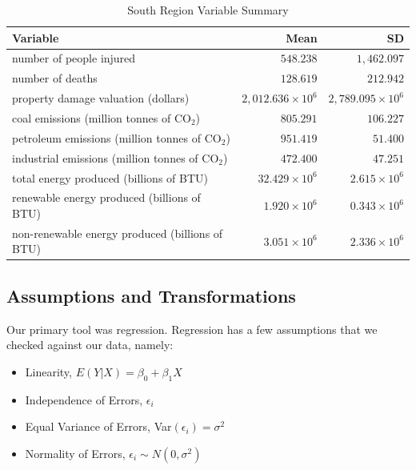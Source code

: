 \documentclass[10pt,]{article}
\begin{document}
\begin{center}
  \begin{table}[h!]
  \caption{\label{tab:table-name}South Region Variable Summary}
  \smallskip
  \begin{center}
  \begin{tabular}{|l r r|}
  \hline
  Variable & Mean & SD \\ [0.5ex] 
  \hline\hline
  number of people injured & $548.238$ & $1,462.097$ \\ 
  \hline
  number of deaths & $128.619$ & $212.942$ \\
  \hline
  property damage valuation (dollars) & $2,012.636 \times 10^6$ & $2,789.095 \times 10^6$ \\
  \hline
  coal emissions (million tonnes of CO$_2$) & $805.291$ & $106.227$ \\
  \hline
  petroleum emissions (million tonnes of CO$_2$) & $951.419$ & $51.400$ \\
  \hline
  industrial emissions (million tonnes of CO$_2$) & $472.400$ & $47.251$ \\ 
  \hline
  total energy produced (billions of BTU) & $32.429 \times 10^6$ & $2.615 \times 10^6$ \\
  \hline
  renewable energy produced (billions of BTU) & $1.920 \times 10^6$ & $0.343 \times 10^6$ \\
  \hline
  non-renewable energy produced (billions of BTU) & $3.051 \times 10^6$ & $2.336 \times 10^6$ \\
  \hline
  \end{tabular}
  \end{center}
  \end{table}
\end{center}

\subsection{Assumptions and
Transformations}\label{assumptions-and-transformations}

Our primary tool was regression. Regression has a few assumptions that
we checked against our data, namely:

\begin{itemize}
  \item Linearity, $E(Y|X) = \beta_0 + \beta_1X$
  \item Independence of Errors, $\epsilon_i$
  \item Equal Variance of Errors, Var$(\epsilon_i)=\sigma^2$
  \item Normality of Errors, $\epsilon_i \sim N(0,\sigma^2)$
\end{itemize}
\end{document}
